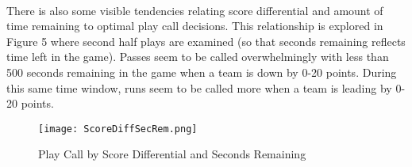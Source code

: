\documentclass[11pt]{article}
\begin{document}
\begin{multicols*}{2}
                \vspace{-10pt}
                \paragraph{}
                    There is also some visible tendencies relating score differential and amount of time remaining to optimal play call decisions. 
                    This relationship is explored in Figure 5 where second half plays are examined (so that seconds remaining reflects time left in the game).
                    Passes seem to be called overwhelmingly with less than 500 seconds remaining in the game when a team is down by 0-20 points. 
                    During this same time window, runs seem to be called more when a team is leading by 0-20 points.
                    
                    \end{multicols*}
                    \begin{figure}[ht]
                        \texttt{[image: ScoreDiffSecRem.png]}
                        \caption{Play Call by Score Differential and Seconds Remaining}
                        \label{fig:Play Call by Score Differential and Seconds Remaining}
                    \end{figure}
\end{document}
